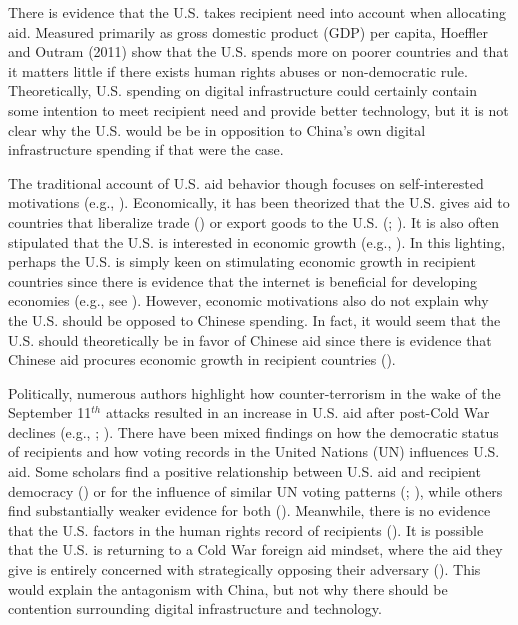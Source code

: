 \documentclass[12pt]{article}
\begin{document}
There is evidence that the U.S. takes recipient need into account when allocating aid. Measured primarily as gross domestic product (GDP) per capita, Hoeffler and Outram (2011) \nocite{hoeffler2011} show that the U.S. spends more on poorer countries and that it matters little if there exists human rights abuses or non-democratic rule. Theoretically, U.S. spending on digital infrastructure could certainly contain some intention to meet recipient need and provide better technology, but it is not clear why the U.S. would be be in opposition to China's own digital infrastructure spending if that were the case. %

The traditional account of U.S. aid behavior though focuses on self-interested motivations (e.g., \cite{mckinlay1977}). Economically, it has been theorized that the U.S. gives aid to countries that liberalize trade (\cite{alesina2000}) or export goods to the U.S. (\cite{younas2008}; \cite{fuchs2014}). It is also often stipulated that the U.S. is interested in economic growth (e.g., \cite{bearce2010b}). In this lighting, perhaps the U.S. is simply keen on stimulating economic growth in recipient countries since there is evidence that the internet is beneficial for developing economies (e.g., see \cite{wallsten2005}). However, economic motivations also do not explain why the U.S. should be opposed to Chinese spending. In fact, it would seem that the U.S. should theoretically be in favor of Chinese aid since there is evidence that Chinese aid procures economic growth in recipient countries (\cite{dreher2021}).

Politically, numerous authors highlight how counter-terrorism in the wake of the September 11$^{th}$ attacks resulted in an increase in U.S. aid after post-Cold War declines (e.g., \cite{fleck2010}; \cite{bearce2010b}). There have been mixed findings on how the democratic status of recipients and how voting records in the United Nations (UN) influences U.S. aid. Some scholars find a positive relationship between U.S. aid and recipient democracy (\cite{alesina2000}) or for the influence of similar UN voting patterns (\cite{alesina2000}; \cite{fuchs2014}), while others find substantially weaker evidence for both (\cite{hoeffler2011}). Meanwhile, there is no evidence that the U.S. factors in the human rights record of recipients (\cite{hoeffler2011}). It is possible that the U.S. is returning to a Cold War foreign aid mindset, where the aid they give is entirely concerned with strategically opposing their adversary (\cite{bearce2010b}). This would explain the antagonism with China, but not why there should be contention surrounding digital infrastructure and technology. %
\end{document}
